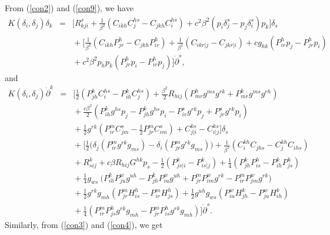 \documentclass[10pt,a4paper]{article}
\theoremstyle{plain}
\theoremstyle{definition}
\begin{document}
From (\ref{con2}) and (\ref{con9}), we have
\begin{eqnarray}
K(\delta_i,\delta_j){\delta_k}
\!\!\!\!&=&\!\!\!\!\Big[R^s_{kji}+\frac{1}{\beta^2}(C_{ikh}C^{hs}_j-C_{jkh}C^{hs}_i)
+c^2\beta^2(p_i\delta^s_j-p_j\delta^s_i)p_k\Big]\delta_s\nonumber\\\!\!\!\!&&\!\!\!\!
+\Big[\frac{1}{\beta^2}(C_{ikh}P^h_{jr}-C_{jkh}P^h_{ir})+\frac{1}{\beta^2}(C_{ikr|j}-C_{jkr|i})+cg_{hk}(P^h_{ir}p_j-P^h_{jr}p_i)\nonumber\\\!\!\!\!&&\!\!\!\!
+c^2\beta^2p_hp_k(P^h_{jr}p_i-P^h_{ir}p_j)\Big]{\dot{\partial}}^s,\label{curvature14}
\end{eqnarray}
and
\begin{eqnarray}
K(\delta_i,\delta_j){\dot{\partial}}^k\!\!\!\!&=&\!\!\!\!
\Big[\frac{1}{2}(P^k_{jh}C^{hs}_i-P^k_{ih}C^{hs}_j)
+\frac{\beta^2}{2}R_{hij}(P^h_{mr}g^{ms}g^{rk}+P^k_{mr}g^{ms}g^{rh})\nonumber\\
\!\!\!\!&&\!\!\!\!
+\frac{c\beta^2}{2}(P^k_{ih}g^{hs}p_j-P^k_{jh}g^{hs}p_i-P^s_{ir}g^{rk}p_j+P^s_{jr}g^{rk}p_i)\nonumber\\
\!\!\!\!&&\!\!\!\!
+\frac{1}{2}g^{rk}(P^m_{ir}C^{s}_{jm}-\frac{1}{2}P^m_{jr}C^{s}_{im})+C^{ks}_{j|i}-C^{ks}_{i|j}\Big]\delta_s\nonumber\\
\!\!\!\!&&\!\!\!\!
+\Big[\frac{1}{2}\Big(\delta_j(P^m_{ir}g^{rk}g_{ms})-\delta_i(P^m_{jr}g^{rk}g_{ms})\Big)
+\frac{1}{\beta^2}(C^{kh}_iC_{jhs}-C^{kh}_jC_{ihs})\nonumber\\
\!\!\!\!&&\!\!\!\!+R^k_{sij}+c\beta R_{hij}G^{hk}p_s-
\frac{1}{2}(P^k_{js|i}-P^k_{is|j})
+\frac{1}{4}(P^k_{jh}P^h_{is}-P^k_{ih}P^h_{js})\nonumber\\
\!\!\!\!&&\!\!\!\!
+\frac{1}{4}g_{ws}\ \big(P^k_{ih}P^w_{ju}g^{uh}-P^k_{jh}P^w_{iu}g^{uh}
+P^m_{jr}P^w_{im}g^{rk}-P^m_{ir}P^w_{jm}g^{rk}\big)\nonumber\\
\!\!\!\!&&\!\!\!\!
+\frac{1}{2}g^{rk}g_{mh}(P^m_{jr}H^h_{is}-P^m_{ir}H^h_{js})+\frac{1}{2}g^{uh}g_{ws}(P^w_{iu}H^k_{jh}-P^w_{ju}H^k_{ih})\nonumber\\
\!\!\!\!&&\!\!\!\!
+\frac{1}{4}(P^m_{ir}P^h_{js}g^{rk}g_{mh}-P^m_{jr}P^h_{is}g^{rk}g_{mh})\Big]{\dot{\partial}}^s.\label{curvature15}
\end{eqnarray}
Similarly, from (\ref{con3}) and (\ref{con4}), we get
\end{document}
